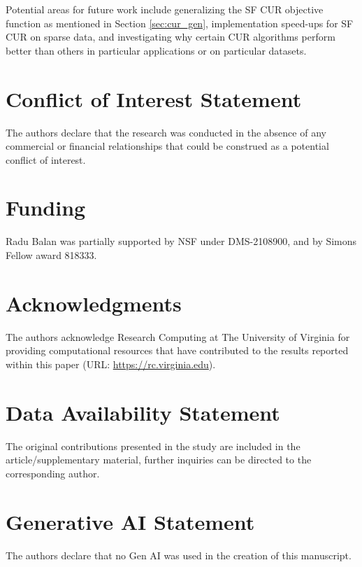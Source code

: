 \documentclass[12pt]{article}
\begin{document}
Potential areas for future work include generalizing the SF CUR objective function as mentioned in Section \ref{sec:cur_gen}, implementation speed-ups for SF CUR on sparse data, and investigating why certain CUR algorithms perform better than others in particular applications or on particular datasets.   


\section*{Conflict of Interest Statement}
The authors declare that the research was conducted in the absence of any commercial or financial relationships that could be construed as a potential conflict of interest.

\section*{Funding}
Radu Balan was partially supported by NSF under DMS-2108900, and by Simons Fellow award 818333.

\section*{Acknowledgments}
The authors acknowledge Research Computing at The University of Virginia for providing computational resources that have contributed to the results reported within this paper (URL: \url{https://rc.virginia.edu}). 

\section*{Data Availability Statement}
The original contributions presented in the study are included in the article/supplementary material, further inquiries can be directed to the corresponding author.

\section*{Generative AI Statement}
The authors declare that no Gen AI was used in the creation of this manuscript.


\end{document}
